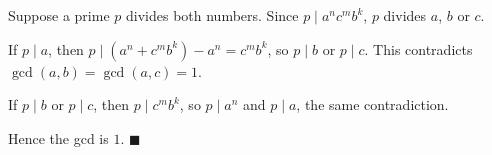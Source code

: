 Suppose a prime $p$ divides both numbers. Since $p\mid a^nc^mb^k$, $p$ divides $a$, $b$ or $c$.

If $p\mid a$, then $p\mid(a^n+c^mb^k)-a^n=c^mb^k$, so $p\mid b$ or $p\mid c$. This contradicts $\gcd(a,b)=\gcd(a,c)=1$.

If $p\mid b$ or $p\mid c$, then $p\mid c^mb^k$, so $p\mid a^n$ and $p\mid a$, the same contradiction.

Hence the gcd is $1$. $\blacksquare$

